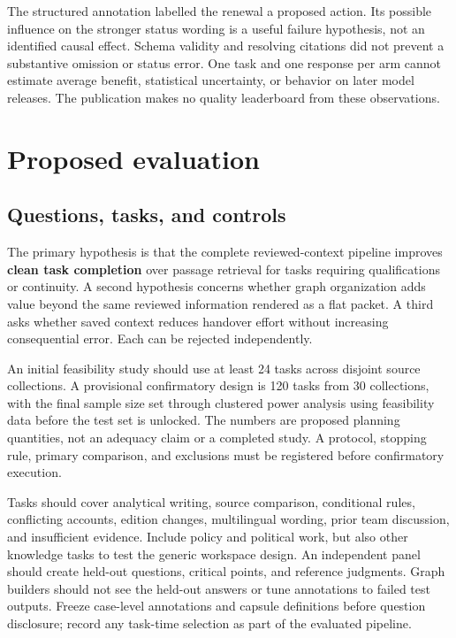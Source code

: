 \documentclass[
  11pt,
]{article}
\let\originalsection\section
\renewcommand{\section}{\Needspace{5\baselineskip}\originalsection}
\begin{document}
The structured annotation labelled the renewal a proposed action. Its
possible influence on the stronger status wording is a useful failure
hypothesis, not an identified causal effect. Schema validity and
resolving citations did not prevent a substantive omission or status
error. One task and one response per arm cannot estimate average
benefit, statistical uncertainty, or behavior on later model releases.
The publication makes no quality leaderboard from these observations.

\section{Proposed evaluation}\label{proposed-evaluation}

\subsection{Questions, tasks, and
controls}\label{questions-tasks-and-controls}

The primary hypothesis is that the complete reviewed-context pipeline
improves \textbf{clean task completion} over passage retrieval for tasks
requiring qualifications or continuity. A second hypothesis concerns
whether graph organization adds value beyond the same reviewed
information rendered as a flat packet. A third asks whether saved
context reduces handover effort without increasing consequential error.
Each can be rejected independently.

An initial feasibility study should use at least 24 tasks across
disjoint source collections. A provisional confirmatory design is 120
tasks from 30 collections, with the final sample size set through
clustered power analysis using feasibility data before the test set is
unlocked. The numbers are proposed planning quantities, not an adequacy
claim or a completed study. A protocol, stopping rule, primary
comparison, and exclusions must be registered before confirmatory
execution.

Tasks should cover analytical writing, source comparison, conditional
rules, conflicting accounts, edition changes, multilingual wording,
prior team discussion, and insufficient evidence. Include policy and
political work, but also other knowledge tasks to test the generic
workspace design. An independent panel should create held-out questions,
critical points, and reference judgments. Graph builders should not see
the held-out answers or tune annotations to failed test outputs. Freeze
case-level annotations and capsule definitions before question
disclosure; record any task-time selection as part of the evaluated
pipeline.
\end{document}
